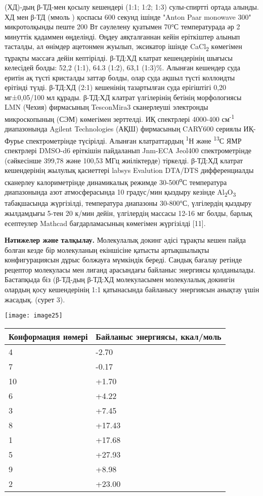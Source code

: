 \begin{multicols}{2}
(ХД)-дың β-ТД-мен қосылу кешендері (1:1; 1:2; 1:3) сулы-спиртті ортада
алынды. ХД мен β-ТД (ммоль ) қоспасы 600 секунд ішінде "Anton Paar
monowave 300" микротолқынды пеште 200 Вт сәулелену қуатымен 70°С
температурада әр 2 минуттік қадаммен өңделінді. Өңдеу аяқталғаннан кейін
еріткіштер алынып тасталды, ал өнімдер ацетонмен жуылып, эксикатор
ішінде CaCl\textsubscript{2} көмегімен тұрақты массаға дейін кептірілді.
β-ТД:ХД клатрат кешендерінің шығысы келесідей болды: 52,2 (1:1), 64.3
(1:2), 63,1 (1:3)\%. Алынған кешендер суда еритін ақ түсті кристалды
заттар болды, олар суда ақшыл түсті коллоидты ерітінді түзді. β-ТД:ХД
(2:1) кешенінің тазартылған суда ерігіштігі 0,20 мг±0,05/100 мл құрады.
β-ТД:ХД клатрат үлгілерінің бетінің морфологиясы LMN (Чехия) фирмасының
TesconMira3 сканерлеуші электронды микроскопының (СЭМ) көмегімен
зерттелді. ИҚ спектрлері 4000-400 см\textsuperscript{-1} диапазонында
Agilent Technologies (АҚШ) фирмасының CARY600 сериялы ИҚ-Фурье
спектрометрінде түсірілді. Алынған клатраттардың \textsuperscript{1}Н
және \textsuperscript{13}С ЯМР спектрлері DMSO-d6 еріткішін пайдаланып
Jnm-ECA Jeol400 спектрометрінде (сәйкесінше 399,78 және 100,53 МГц
жиіліктерде) тіркелді. β-ТД:ХД клатрат кешендерінің жылулық қасиеттері
labsys Evalution DTA/DTS дифференциалды сканерлеу калориметрінде
динамикалық режимде 30-500\textsuperscript{о}С температура диапазонында
азот атмосферасында 10 градус/мин қыздыру кезінде
Al\textsubscript{2}O\textsubscript{3} табақшасында жүргізілді,
температура диапазоны 30-800°С, үлгілердің қыздыру жылдамдығы 5-тен 20
к/мин дейін, үлгілердің массасы 12-16 мг болды, барлық есептеулер
Mathcad бағдарламасының көмегімен жүргізілді {[}11{]}.

{\bfseries Нәтижелер және талқылау.} Молекулалық докинг әдісі тұрақты кешен
пайда болған кезде бір молекуланың екіншісіне қатысты артықшылықты
конфигурациясын дұрыс болжауға мүмкіндік береді. Сандық бағалау ретінде
рецептор молекуласы мен лиганд арасындағы байланыс энергиясы
қолданылады. Бастапқыда біз (β-ТД-дың β-ТД:ХД молекуласымен молекулалық
докингін олардың қосу кешендерінің 1:1 қатынасында байланысу энергиясын
анықтау үшін жасадық. (сурет 3).

{\centering
\texttt{[image: image25]}
}
{\centering
\begin{tabular}{|p{}|p{}|}
\hline
\textbf{Конформация нөмері} & \textbf{Байланыс энергиясы, ккал/моль} \\
\hline
4 & -2.70 \\
7 & -0.17 \\
10 & +1.70 \\
6 & +4.22 \\
3 & +7.45 \\
8 & +17.43 \\
1 & +17.68 \\
5 & +27.93 \\
9 & +8.98 \\
2 & +23.00 \\
\hline
\end{tabular}
}


\end{multicols}
